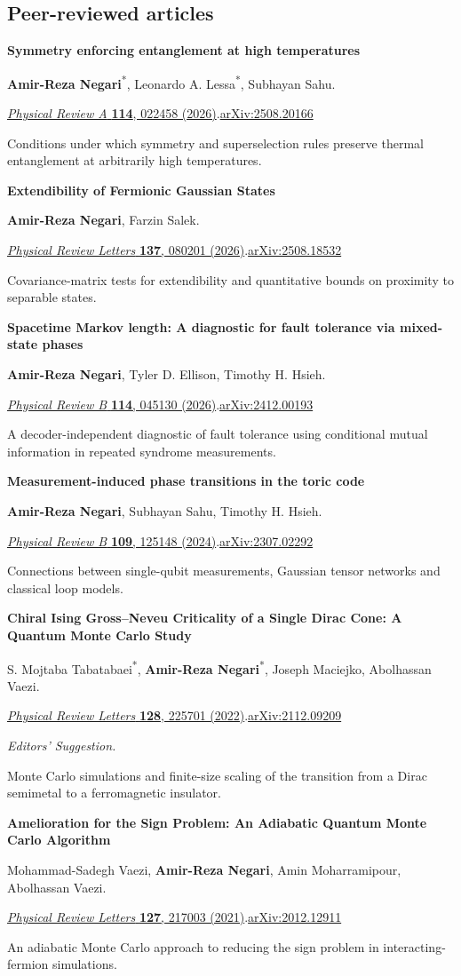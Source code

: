\documentclass[10pt,letterpaper]{article}
\newcommand{\me}{\textbf{Amir-Reza Negari}}
\newcommand{\equal}{\textsuperscript{*}}
\newcommand{\paper}[5]{\needspace{60pt}\noindent\makebox[20pt][l]{\textcolor{muted}{#1.}}\begin{minipage}[t]{\dimexpr\linewidth-20pt\relax}\raggedright\textbf{#2}\par #3\par #4\par{\color{muted}#5}\end{minipage}\par\vspace{3pt}}
\begin{document}
\subsection{Peer-reviewed articles}
\paper{1}{Symmetry enforcing entanglement at high temperatures}
{\me\equal, Leonardo A. Lessa\equal, Subhayan Sahu.}
{\href{https://doi.org/10.1103/rckt-3lfm}{\textit{Physical Review A} \textbf{114}, 022458 (2026)}.\enspace\href{https://arxiv.org/abs/2508.20166}{arXiv:2508.20166}}
{Conditions under which symmetry and superselection rules preserve thermal entanglement at arbitrarily high temperatures.}
\paper{2}{Extendibility of Fermionic Gaussian States}
{\me, Farzin Salek.}
{\href{https://doi.org/10.1103/65dd-448y}{\textit{Physical Review Letters} \textbf{137}, 080201 (2026)}.\enspace\href{https://arxiv.org/abs/2508.18532}{arXiv:2508.18532}}
{Covariance-matrix tests for extendibility and quantitative bounds on proximity to separable states.}
\paper{3}{Spacetime Markov length: A diagnostic for fault tolerance via mixed-state phases}
{\me, Tyler D. Ellison, Timothy H. Hsieh.}
{\href{https://doi.org/10.1103/61wf-zx39}{\textit{Physical Review B} \textbf{114}, 045130 (2026)}.\enspace\href{https://arxiv.org/abs/2412.00193}{arXiv:2412.00193}}
{A decoder-independent diagnostic of fault tolerance using conditional mutual information in repeated syndrome measurements.}
\paper{4}{Measurement-induced phase transitions in the toric code}
{\me, Subhayan Sahu, Timothy H. Hsieh.}
{\href{https://doi.org/10.1103/PhysRevB.109.125148}{\textit{Physical Review B} \textbf{109}, 125148 (2024)}.\enspace\href{https://arxiv.org/abs/2307.02292}{arXiv:2307.02292}}
{Connections between single-qubit measurements, Gaussian tensor networks and classical loop models.}
\paper{5}{Chiral Ising Gross--Neveu Criticality of a Single Dirac Cone: A Quantum Monte Carlo Study}
{S. Mojtaba Tabatabaei\equal, \me\equal, Joseph Maciejko, Abolhassan Vaezi.}
{\href{https://doi.org/10.1103/PhysRevLett.128.225701}{\textit{Physical Review Letters} \textbf{128}, 225701 (2022)}.\enspace\href{https://arxiv.org/abs/2112.09209}{arXiv:2112.09209}\par\textit{Editors' Suggestion.}}
{Monte Carlo simulations and finite-size scaling of the transition from a Dirac semimetal to a ferromagnetic insulator.}
\paper{6}{Amelioration for the Sign Problem: An Adiabatic Quantum Monte Carlo Algorithm}
{Mohammad-Sadegh Vaezi, \me, Amin Moharramipour, Abolhassan Vaezi.}
{\href{https://doi.org/10.1103/PhysRevLett.127.217003}{\textit{Physical Review Letters} \textbf{127}, 217003 (2021)}.\enspace\href{https://arxiv.org/abs/2012.12911}{arXiv:2012.12911}}
{An adiabatic Monte Carlo approach to reducing the sign problem in interacting-fermion simulations.}
\end{document}
